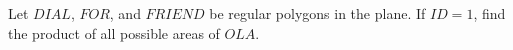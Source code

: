 Let $DIAL$,  $FOR$,  and $FRIEND$ be regular polygons in the plane. If $ID=1$,  find the product of all possible areas of $OLA$.